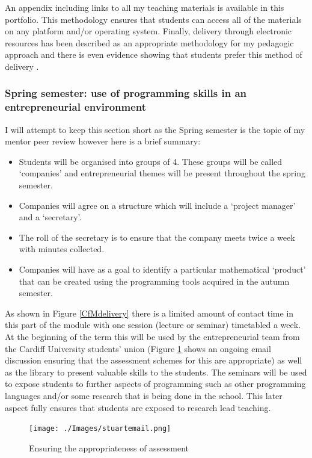 \documentclass{article}
\begin{document}
An appendix including links to all my teaching materials is available in this portfolio. This methodology ensures that students can access all of the materials on any platform and/or operating system. Finally, delivery through electronic resources has been described as an appropriate methodology for my pedagogic approach \cite{kellogg_developing_2009} and there is even evidence showing that students prefer this method of delivery \cite{brown_student_2004}.

\subsubsection{Spring semester: use of programming skills in an entrepreneurial environment}

I will attempt to keep this section short as the Spring semester is the topic of my mentor peer review however here is a brief summary:

\begin{itemize}
\item Students will be organised into groups of 4. These groups will be called `companies' and entrepreneurial themes will be present throughout the spring semester.
\item Companies will agree on a structure which will include a `project manager' and a `secretary'.
\item The roll of the secretary is to ensure that the company meets twice a week with minutes collected.
\item Companies will have as a goal to identify a particular mathematical `product' that can be created using the programming tools acquired in the autumn semester.
\end{itemize}

As shown in Figure \ref{CfMdelivery} there is a limited amount of contact time in this part of the module with one session (lecture or seminar) timetabled a week. At the beginning of the term this will be used by the entrepreneurial team from the Cardiff University students' union (Figure \ref{stuartemail} shows an ongoing email discussion ensuring that the assessment schemes for this are appropriate) as well as the library to present valuable skills to the students. The seminars will be used to expose students to further aspects of programming such as other programming languages and/or some research that is being done in the school. This later aspect fully ensures that students are exposed to research lead teaching.

\begin{figure}[htdp]
\begin{center}
\texttt{[image: ./Images/stuartemail.png]}
\end{center}
\caption{Ensuring the appropriateness of assessment}\label{stuartemail}
\end{figure}
\end{document}
